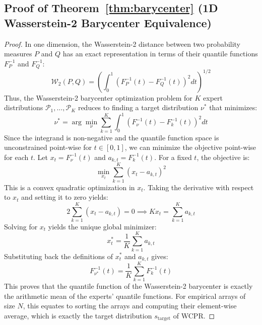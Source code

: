 \documentclass{article}
\theoremstyle{plain}
\theoremstyle{definition}
\theoremstyle{remark}
\begin{document}
\subsection{Proof of Theorem~\ref{thm:barycenter} (1D Wasserstein-2 Barycenter Equivalence)}
\label{app:proof_barycenter}
\begin{proof}
  In one dimension, the Wasserstein-2 distance between two probability measures $P$ and $Q$ has an exact representation in terms of their quantile functions $F_P^{-1}$ and $F_Q^{-1}$:
  \begin{equation}
    \mathcal{W}_2(P, Q) = \left( \int_0^1 \left( F_P^{-1}(t) - F_Q^{-1}(t) \right)^2 dt \right)^{1/2}
  \end{equation}
  Thus, the Wasserstein-2 barycenter optimization problem for $K$ expert distributions $\mathcal{P}_1, \dots, \mathcal{P}_K$ reduces to finding a target distribution $\nu^*$ that minimizes:
  \begin{equation}
    \nu^* = \arg\min_{\nu} \sum_{k=1}^K \int_0^1 \left( F_{\nu}^{-1}(t) - F_k^{-1}(t) \right)^2 dt
  \end{equation}
  Since the integrand is non-negative and the quantile function space is unconstrained point-wise for $t \in [0, 1]$, we can minimize the objective point-wise for each $t$. Let $x_t = F_{\nu}^{-1}(t)$ and $a_{k, t} = F_k^{-1}(t)$. For a fixed $t$, the objective is:
  \begin{equation}
    \min_{x_t} \sum_{k=1}^K (x_t - a_{k, t})^2
  \end{equation}
  This is a convex quadratic optimization in $x_t$. Taking the derivative with respect to $x_t$ and setting it to zero yields:
  \begin{equation}
    2 \sum_{k=1}^K (x_t - a_{k, t}) = 0 \implies K x_t = \sum_{k=1}^K a_{k, t}
  \end{equation}
  Solving for $x_t$ yields the unique global minimizer:
  \begin{equation}
    x_t^* = \frac{1}{K} \sum_{k=1}^K a_{k, t}
  \end{equation}
  Substituting back the definitions of $x_t^*$ and $a_{k, t}$ gives:
  \begin{equation}
    F_{\nu^*}^{-1}(t) = \frac{1}{K} \sum_{k=1}^K F_k^{-1}(t)
  \end{equation}
  This proves that the quantile function of the Wasserstein-2 barycenter is exactly the arithmetic mean of the experts' quantile functions. For empirical arrays of size $N$, this equates to sorting the arrays and computing their element-wise average, which is exactly the target distribution $s_{\text{target}}$ of WCPR.
\end{proof}
\end{document}
